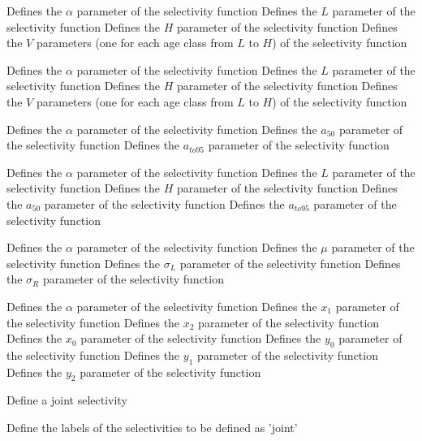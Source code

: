  {Defines the $\alpha$ parameter of the selectivity function}
 {Defines the $L$ parameter of the selectivity function}
 {Defines the $H$ parameter of the selectivity function}
 {Defines the $V$ parameters (one for each age class from $L$ to $H$) of the selectivity function}
\par\textbf{}\par
{} {Defines the $\alpha$ parameter of the selectivity function}
 {Defines the $L$ parameter of the selectivity function}
 {Defines the $H$ parameter of the selectivity function}
 {Defines the $V$ parameters (one for each age class from $L$ to $H$) of the selectivity function}
\par\textbf{}\par
{} {Defines the $\alpha$ parameter of the selectivity function}
 {Defines the $a_{50}$ parameter of the selectivity function}
 {Defines the $a_{to95}$ parameter of the selectivity function}
\par\textbf{}\par
{} {Defines the $\alpha$ parameter of the selectivity function}
 {Defines the $L$ parameter of the selectivity function}
 {Defines the $H$ parameter of the selectivity function}
 {Defines the $a_{50}$ parameter of the selectivity function}
 {Defines the $a_{to95}$ parameter of the selectivity function}
\par\textbf{}\par
{} {Defines the $\alpha$ parameter of the selectivity function}
 {Defines the $\mu$ parameter of the selectivity function}
 {Defines the $\sigma_L$ parameter of the selectivity function}
 {Defines the $\sigma_R$ parameter of the selectivity function}
\par\textbf{}\par
{} {Defines the $\alpha$ parameter of the selectivity function}
 {Defines the $x_1$ parameter of the selectivity function}
 {Defines the $x_2$ parameter of the selectivity function}
 {Defines the $x_0$ parameter of the selectivity function}
 {Defines the $y_0$ parameter of the selectivity function}
 {Defines the $y_1$ parameter of the selectivity function}
 {Defines the $y_2$ parameter of the selectivity function}
\par{} {Define a joint selectivity}\par
{} {Define the labels of the selectivities to be defined as 'joint'}
